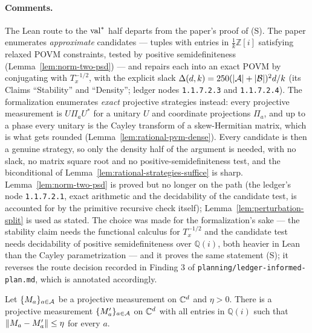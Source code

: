 \paragraph{Comments.} The Lean route to the $\valstar$ half departs from the paper's proof
of (S). The paper enumerates \emph{approximate} candidates --- tuples with entries in
$\frac1k \mathbb{Z}[i]$ satisfying relaxed POVM constraints, tested by positive
semidefiniteness (Lemma~\ref{lem:norm-two-psd}) --- and repairs each into an exact POVM by
conjugating with $T_x^{-1/2}$, with the explicit slack $\Delta(d,k) = 250(\abs{\cal A} +
\abs{\cal B})^2 d/k$ (its Claims ``Stability'' and ``Density''; ledger nodes
\texttt{1.1.7.2.3} and \texttt{1.1.7.2.4}). The formalization enumerates \emph{exact}
projective strategies instead: every projective measurement is $U \Pi_a U^*$ for a unitary
$U$ and coordinate projections $\Pi_a$, and up to a phase every unitary is the Cayley
transform of a skew-Hermitian matrix, which is what gets rounded
(Lemma~\ref{lem:rational-pvm-dense}). Every candidate is then a genuine strategy, so only
the density half of the argument is needed, with no slack, no matrix square root and no
positive-semidefiniteness test, and the biconditional of
Lemma~\ref{lem:rational-strategies-suffice} is sharp. Lemma~\ref{lem:norm-two-psd} is
proved but no longer on the path (the ledger's node \texttt{1.1.7.2.1}, exact arithmetic
and the decidability of the candidate test, is accounted for by the primitive recursive
check itself); Lemma~\ref{lem:perturbation-split} is used as stated. The
choice was made for the formalization's sake --- the stability claim needs the functional
calculus for $T_x^{-1/2}$ and the candidate test needs decidability of positive
semidefiniteness over $\mathbb{Q}(i)$, both heavier in Lean than the Cayley
parametrization --- and it proves the same statement (S); it reverses the route decision
recorded in Finding 3 of \texttt{planning/ledger-informed-plan.md}, which is annotated
accordingly.

\begin{lemma}
\label{lem:rational-pvm-dense}
\leanok
Let $\{M_a\}_{a \in \cal A}$ be a projective measurement on $\C^d$ and $\eta > 0$. There is
a projective measurement $\{M'_a\}_{a \in \cal A}$ on $\C^d$ with all entries in
$\mathbb{Q}(i)$ such that $\norm{M_a - M'_a} \leq \eta$ for every $a$.
\end{lemma}

